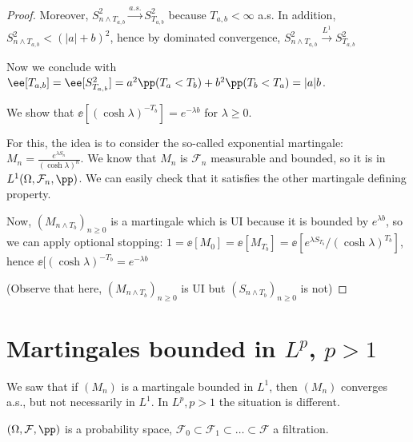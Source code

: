\documentclass[../main.tex]{subfiles}
\begin{document}
\begin{proof}
     Moreover, $S_{n \wedge T_{a, b}}^2 \overset{a.s.}{\longrightarrow} S_{T_{a,
     b}}^2$ because $T_{a, b} < \infty$ a.s. In addition, 
     $S_{n \wedge T_{a, b}}^2 < (|a| + b)^2$, hence by dominated convergence, 
     $S_{n \wedge T_{a, b}}^2 \overset{L^1}{\longrightarrow} S_{T_{a,
     b}}^2$

     Now we conclude with $\ee[T_{a, b}] = \ee[S_{T_{a, b}}^2] = a^2 \pp(T_a <
     T_b) + b^2 \pp(T_b < T_a) = |a|b$.

     \vspace{0.8em}

      We show that $\ee[(\cosh \lambda)^{-T_b}] = e^{-\lambda b}$ for
     $\lambda \geq 0$.

     For this, the idea is to consider the so-called exponential martingale:
     $M_n = \frac{e^{\lambda S_n}}{(\cosh \lambda) ^ n} $. We know that $M_n$ is
     $\mathcal{F}_n$ measurable and bounded, so it is in $L^1(\Omega,
     \mathcal{F}_n, \pp)$. We can easily check that it satisfies the other
     martingale defining property.

     Now, $(M_{n \wedge T_{b}})_{n \geq 0}$ is a martingale which is UI
     because it is bounded by $e^{\lambda b}$, so we can apply optional
     stopping: $1 = \ee[M_0] = \ee[M_{T_{b}}] = \ee[e^{\lambda S_{T_b}} / (\cosh
     \lambda)^{T_b}]$, hence $\ee[(\cosh \lambda)^{-T_b} = e^{- \lambda b}$

     (Observe that here, $(M_{n \wedge T_b})_{n \geq 0}$ is UI but $(S_{n \wedge
     T_b})_{n \geq 0}$ is not)
  \end{proof}

  \section{Martingales bounded in $L^p$, $p>1$}
  We saw that if $(M_n)$ is a martingale bounded in $L^1$, then $(M_n)$
  converges a.s., but not necessarily in $L^1$. In $L^p, p > 1$ the situation is
  different.

  $(\Omega, \mathcal{F}, \pp)$ is a probability space, $\mathcal{F}_0 \subset
  \mathcal{F}_1 \subset \ldots \subset \mathcal{F}$ a filtration.
\end{document}
